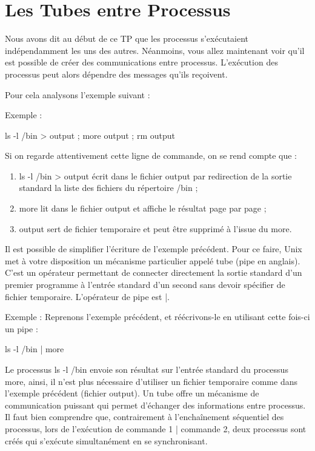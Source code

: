 \documentclass[10pt,a4paper]{article}
\begin{document}
\section{Les Tubes entre Processus}

Nous avons dit au début de ce TP que les processus s'exécutaient indépendamment les uns des autres. Néanmoins, vous allez maintenant voir qu'il est possible de créer des communications entre processus. L'exécution des processus peut alors dépendre des messages qu'ils reçoivent. 

Pour cela analysons l'exemple suivant :

Exemple : 
\begin{mylisting}
 ls -l /bin > output ; more output ; rm output
\end{mylisting}

Si on regarde attentivement cette ligne de commande, on se rend compte que :
\begin{enumerate}
\item ls -l /bin > output écrit dans le fichier output par redirection de la sortie standard la liste des fichiers du répertoire /bin ;
\item more lit dans le fichier output et affiche le résultat page par page ;
\item output sert de fichier temporaire et peut être supprimé à l'issue du more.
\end{enumerate}

Il est possible de simplifier l'écriture de l'exemple précédent. Pour ce faire, Unix met à votre disposition un mécanisme particulier appelé tube (pipe en anglais). C'est un opérateur permettant de connecter directement la sortie standard d'un premier programme à l'entrée standard d'un second sans devoir spécifier de fichier
temporaire. L'opérateur de pipe est |.

Exemple : Reprenons l'exemple précédent, et réécrivons-le en utilisant cette fois-ci un pipe :

\begin{mylisting}
ls -l /bin | more
\end{mylisting}

Le processus ls -l /bin envoie son résultat sur l'entrée standard du processus more, ainsi, il n'est plus nécessaire d'utiliser un fichier temporaire comme dans l'exemple précédent (fichier output). Un tube offre un mécanisme de communication puissant qui permet d'échanger des informations entre processus. Il faut bien comprendre que, contrairement à l'enchaînement séquentiel des processus, lors de l'exécution de commande 1 | commande 2, deux processus sont créés qui s'exécute simultanément en se synchronisant.
\end{document}

